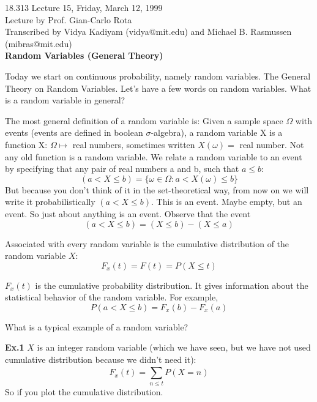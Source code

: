 {\Large 18.313 Lecture 15, Friday, March 12, 1999}\\
{\large Lecture by Prof. Gian-Carlo Rota}\\
Transcribed by Vidya Kadiyam (vidya@mit.edu) and Michael B. Rasmussen (mibras@mit.edu)\\

{\bf Random Variables (General Theory)}

Today we start on continuous probability, namely random variables.
The General Theory on Random Variables.
Let's have a few words on random variables.
What is a random variable in general?
\par The most general definition of a random variable is: 
Given a sample space $\Omega$  with events (events are defined in
boolean $\sigma$-algebra), a random variable X is a function X:
$\Omega \mapsto$ real numbers, sometimes written $X(\omega) =$ real
number.
Not any old function is a random variable.
We relate a random variable to an event by specifying that any pair of
real numbers a and b, such that $a \leq b$:
\begin{displaymath}
 (a < X \leq b) = \{\omega \in \Omega: a < X (\omega) \leq b\} 
\end{displaymath} 
But because you don't think of it in the set-theoretical way, from now on we will write it probabilistically $(a < X \leq b)$.
This is an event. Maybe empty, but an event. So just about anything is
an event. Observe that the event \begin{displaymath}
 (a < X \leq b) = (X \leq b) - (X \leq a)  \end{displaymath}

Associated with every random variable is the cumulative distribution of the
random variable $X$:
\begin{displaymath}
 F_{x}(t)= F(t) = P(X \leq t) 
\end{displaymath}

$ F_{x}(t)$  is the cumulative probability distribution. It gives information
about the statistical behavior of the random variable.
For example, \begin{displaymath} P(a < X \leq b) = F_{x}(b) - F_{x}(a)
\end{displaymath}

What is a typical example of a random variable?
\par {\bf Ex.1}
$X$ is an integer random variable (which we have seen, but we have not
used cumulative distribution because we didn't need it):
\begin{displaymath} F_{x}(t)= \sum_{n \leq t}^{} P(X=n) \end{displaymath}
So if you plot the cumulative distribution.

